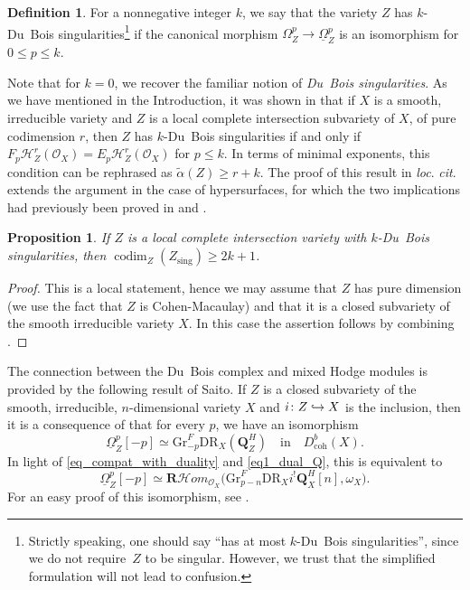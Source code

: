 \documentclass[11pt]{article}
\numberwithin{equation}{section}
\newcommand\hto{\mathrel{\lhook\joinrel\to}}
\theoremstyle{plain}
\newtheorem{prop}[thm]{Proposition}
\theoremstyle{definition}
\newtheorem{defi}[thm]{Definition}
\newcommand\Q{{\mathbf Q}}
\newcommand\R{{\mathbf R}}
\newcommand\cH{\mathcal{H}}
\newcommand\cO{\mathcal{O}}
\newcommand\cH{\mathcal{H}}
\newcommand\cO{\mathcal{O}}
\newcommand\gr{\mathrm{Gr}}
\newcommand\DR{\mathrm{DR}}
\newcommand\sing{\mathrm{sing}}
\DeclareMathOperator{\codim}{codim}
\begin{document}
\begin{defi}\label{defi_k_DuBois}
For a nonnegative integer $k$, we say that the variety $Z$ has $k$\nobreakdash-Du~Bois singularities\footnote{Strictly speaking, one should say ``has at most $k$-Du~Bois singularities'', since we do not require~$Z$ to be singular. However,
we trust that the simplified formulation will not lead to confusion.} if the canonical morphism $\Omega_Z^p\to \underline{\Omega}_Z^p$ is an isomorphism for $0\leq p\leq k$.
\end{defi}

Note that for $k=0$, we recover the familiar notion of \emph{Du~Bois singularities}.
As we have mentioned in the Introduction, it was shown in \cite[Th.\,F]{MP1} that if $X$ is a smooth, irreducible variety and $Z$ is a local complete intersection
subvariety of $X$, of pure codimension $r$, then $Z$ has $k$-Du~Bois singularities if and only if $F_p\cH^r_Z(\cO_X)=E_p\cH^r_Z(\cO_X)$ for $p\leq k$. In terms of minimal exponents,
this condition can be rephrased as $\widetilde{\alpha}(Z)\geq r+k$. The proof of this result in \emph{loc}. \emph{cit}. extends the argument in the case of hypersurfaces,
for which the two implications had previously been proved in
\cite{MOPW} and \cite{Saito_et_al}.

\begin{prop}\label{sing_locus_Du_Bois}
If $Z$ is a local complete intersection variety with $k$-Du~Bois singularities, then
$\codim_Z(Z_\sing)\geq 2k+1$.
\end{prop}

\begin{proof}
This is a local statement, hence we may assume that $Z$ has pure dimension (we use the fact that
$Z$ is Cohen-Macaulay) and that it is a closed subvariety of the smooth irreducible variety $X$. In this case the assertion follows by combining
\cite[Cor.\,3.40 and Th.\,F]{MP1}.
\end{proof}

The connection between the Du~Bois complex and mixed Hodge modules is provided by the following result of Saito. If $Z$ is a closed subvariety
of the smooth, irreducible, $n$-dimensional variety $X$ and $i\colon Z\hto X$ is the inclusion, then it is a consequence of
\cite[Th.\,4.2]{Saito-HC} that for every $p$, we have an isomorphism
\begin{equation}\label{eq_Saito_DuBois}
\underline{\Omega}_Z^p[-p]\simeq \gr^F_{-p}\DR_X(\Q_Z^H)\quad\text{in}\quad D^b_\mathrm{coh}(X).
\end{equation}
In light of \eqref{eq_compat_with_duality} and \eqref{eq1_dual_Q}, this is equivalent to
\begin{equation}\label{eq2_Saito_DuBois}
\underline{\Omega}_Z^p[-p]\simeq \R\cH om_{\cO_X}\big(\gr^F_{p-n}\DR_Xi^!\Q_X^H[n],\omega_X\big).
\end{equation}
For an easy proof of this isomorphism, see \cite[Prop.\,5.5]{MP1}.
\end{document}
